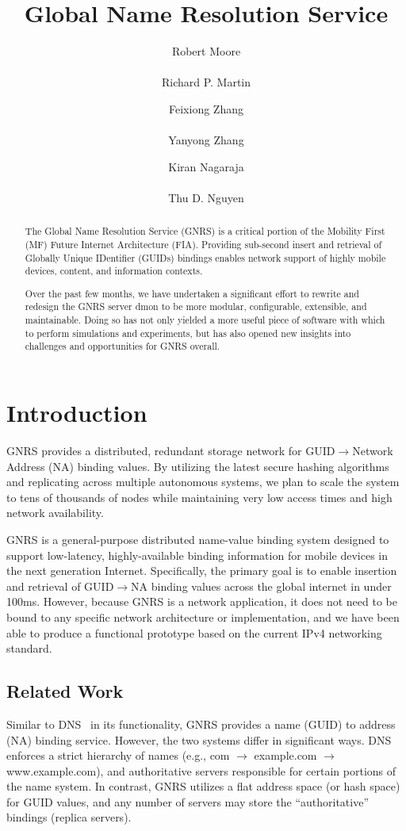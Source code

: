 \documentclass{article}
\title{Global Name Resolution Service}
\author{Robert Moore\\
\\
Richard P. Martin\\
\and
Feixiong Zhang\\
\\
Yanyong Zhang\\
\and
Kiran Nagaraja\\
\\
Thu D. Nguyen\\
}
\begin{document}
\maketitle
\begin{abstract}
The Global Name Resolution Service (GNRS) is a critical portion of the
Mobility First (MF) Future Internet Architecture (FIA). Providing sub-second
insert and retrieval of Globally Unique IDentifier (GUIDs) bindings enables
network support of highly mobile devices, content, and information contexts.

Over the past few months, we have undertaken a significant effort to rewrite
and redesign the GNRS server dmon to be more modular, configurable,
extensible, and maintainable.  Doing so has not only yielded a more useful
piece of software with which to perform simulations and experiments, but has
also opened new insights into challenges and opportunities for GNRS overall.
\end{abstract}
\section{Introduction}
GNRS provides a distributed, redundant storage network for
GUID$\rightarrow$Network Address (NA) binding values.  By utilizing the latest
secure hashing algorithms and replicating across multiple autonomous systems,
we plan  to scale the system to tens of thousands of nodes while maintaining
very low access times and high network availability.

GNRS is a general-purpose distributed name-value binding system designed to
support low-latency, highly-available binding information for mobile devices
in the next generation Internet.  Specifically, the primary goal is to enable
insertion and retrieval of GUID$\rightarrow$NA binding values across the
global internet in under 100ms.  However, because GNRS is a network
application, it does not need to be bound to any specific network architecture
or implementation, and we have been able to produce a functional prototype
based on the current IPv4 networking standard.


\subsection{Related Work}
Similar to DNS~\cite{rfc1035} in its functionality, GNRS provides a name (GUID) to address
(NA) binding service.  However, the two systems differ in significant ways.
DNS enforces a strict hierarchy of names (e.g., com $\rightarrow$ example.com
$\rightarrow$ www.example.com), and authoritative servers responsible for
certain portions of the name system.  In contrast, GNRS utilizes a flat
address space (or hash space) for GUID values, and any number of servers may
store the ``authoritative'' bindings (replica servers).
\end{document}
